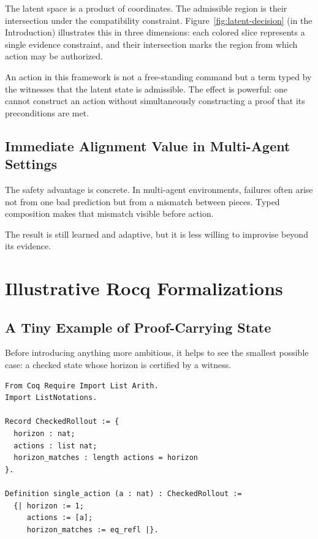 \documentclass[12pt, a4paper]{article}
\begin{document}
The latent space is a product of coordinates. The admissible region is their
intersection under the compatibility constraint. Figure~\ref{fig:latent-decision}
(in the Introduction) illustrates this in three dimensions: each colored slice
represents a single evidence constraint, and their intersection marks the region
from which action may be authorized.

An action in this framework is not a free-standing command but a term typed by
the witnesses that the latent state is admissible. The effect is powerful: one
cannot construct an action without simultaneously constructing a proof that its
preconditions are met.

\subsection{Immediate Alignment Value in Multi-Agent Settings}

The safety advantage is concrete. In multi-agent environments, failures often
arise not from one bad prediction but from a mismatch between pieces. Typed
composition makes that mismatch visible before action.

The result is still learned and adaptive, but it is less willing to improvise
beyond its evidence.

\section{Illustrative Rocq Formalizations}
\label{sec:rocq}

\subsection{A Tiny Example of Proof-Carrying State}

Before introducing anything more ambitious, it helps to see the smallest
possible case: a checked state whose horizon is certified by a witness.

\begin{lstlisting}[caption={A minimal checked state in Rocq},
                   label={lst:minimal}]
From Coq Require Import List Arith.
Import ListNotations.

Record CheckedRollout := {
  horizon : nat;
  actions : list nat;
  horizon_matches : length actions = horizon
}.

Definition single_action (a : nat) : CheckedRollout :=
  {| horizon := 1;
     actions := [a];
     horizon_matches := eq_refl |}.
\end{lstlisting}
\end{document}
